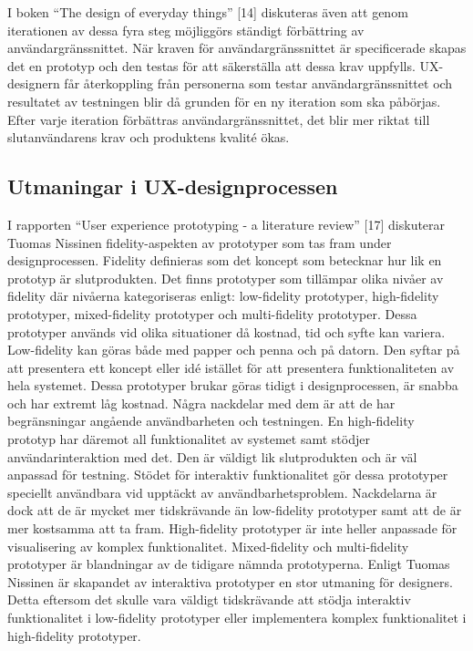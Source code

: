 \documentclass[12pt]{kththesis}
\begin{document}
I boken “The design of everyday things” [14] diskuteras även att genom iterationen av dessa fyra steg möjliggörs ständigt förbättring av användargränssnittet. När kraven för användargränssnittet är specificerade skapas det en prototyp och den testas för att säkerställa att dessa krav uppfylls. UX-designern får återkoppling från personerna som testar användargränssnittet och resultatet av testningen blir då grunden för en ny iteration som ska påbörjas. Efter varje iteration förbättras användargränssnittet, det blir mer riktat till slutanvändarens krav och produktens kvalité ökas.

\subsection{Utmaningar i UX-designprocessen}

I rapporten “User experience prototyping - a literature review” [17] diskuterar Tuomas Nissinen fidelity-aspekten av prototyper som tas fram under designprocessen. Fidelity definieras som det koncept som betecknar hur lik en prototyp är slutprodukten. Det finns prototyper som tillämpar olika nivåer av fidelity där nivåerna kategoriseras enligt: low-fidelity prototyper, high-fidelity prototyper, mixed-fidelity prototyper och multi-fidelity prototyper. Dessa prototyper används vid olika situationer då kostnad, tid och syfte kan variera. Low-fidelity kan göras både med papper och penna och på datorn. Den syftar på att presentera ett koncept eller idé istället för att presentera funktionaliteten av hela systemet. Dessa prototyper brukar göras tidigt i designprocessen, är snabba och har extremt låg kostnad. Några nackdelar med dem är att de har begränsningar angående användbarheten och testningen. En high-fidelity prototyp har däremot all funktionalitet av systemet samt stödjer användarinteraktion med det. Den är väldigt lik slutprodukten och är väl anpassad för testning. Stödet för interaktiv funktionalitet gör dessa prototyper speciellt användbara vid upptäckt av användbarhetsproblem. Nackdelarna är dock att de är mycket mer tidskrävande än low-fidelity prototyper samt att de är mer kostsamma att ta fram. High-fidelity prototyper är inte heller anpassade för visualisering av komplex funktionalitet. Mixed-fidelity och multi-fidelity prototyper är blandningar av de tidigare nämnda prototyperna. Enligt Tuomas Nissinen är skapandet av interaktiva prototyper en stor utmaning för designers. Detta eftersom det skulle vara väldigt tidskrävande att stödja interaktiv funktionalitet i low-fidelity prototyper eller implementera komplex funktionalitet i high-fidelity prototyper.
\end{document}
